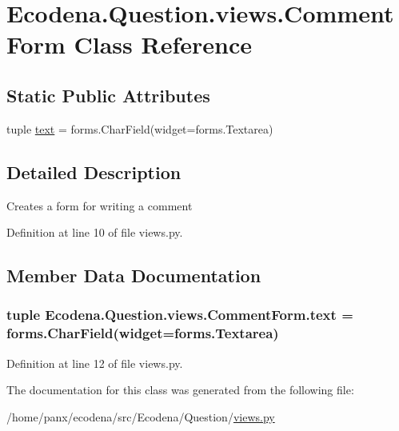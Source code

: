 \hypertarget{class_ecodena_1_1_question_1_1views_1_1_comment_form}{
\section{Ecodena.Question.views.CommentForm Class Reference}
\label{d1/dd1/class_ecodena_1_1_question_1_1views_1_1_comment_form}
}
\subsection*{Static Public Attributes}
\begin{DoxyCompactItemize}
\item 
tuple \hyperlink{class_ecodena_1_1_question_1_1views_1_1_comment_form_a698d74b3868829c3b183a79051af04e9}{text} = forms.CharField(widget=forms.Textarea)
\end{DoxyCompactItemize}


\subsection{Detailed Description}
\begin{DoxyVerb}Creates a form for writing a comment\end{DoxyVerb}
 

Definition at line 10 of file views.py.



\subsection{Member Data Documentation}
\hypertarget{class_ecodena_1_1_question_1_1views_1_1_comment_form_a698d74b3868829c3b183a79051af04e9}{
\subsubsection[{text}]{\setlength{\rightskip}{0pt plus 5cm}tuple {\bf Ecodena.Question.views.CommentForm.text} = forms.CharField(widget=forms.Textarea)}}
\label{d1/dd1/class_ecodena_1_1_question_1_1views_1_1_comment_form_a698d74b3868829c3b183a79051af04e9}


Definition at line 12 of file views.py.



The documentation for this class was generated from the following file:\begin{DoxyCompactItemize}
\item 
/home/panx/ecodena/src/Ecodena/Question/\hyperlink{_question_2views_8py}{views.py}\end{DoxyCompactItemize}
